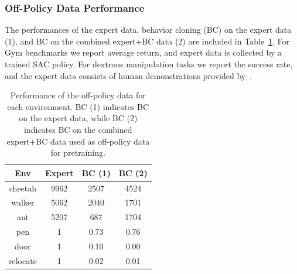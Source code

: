 \documentclass[conference]{IEEEtran}
\begin{document}
\subsubsection{Off-Policy Data Performance}

The performances of the expert data, behavior cloning (BC) on the expert data (1), and BC on the combined expert+BC data (2) are included in Table~\ref{fig:bc}. For Gym benchmarks we report average return, and expert data is collected by a trained SAC policy. For dextrous manipulation tasks we report the success rate, and the expert data consists of human demonstrations provided by~\citet{rajeswaran2018dextrous}.

\begin{table}[h!]
\footnotesize
\begin{tabular}{c|c|c|c}
Env         & Expert & BC (1) & BC (2) \\ \hline
cheetah & 9962   & 2507         & 4524      \\
walker      & 5062   & 2040         & 1701      \\
ant         & 5207   & 687          & 1704      \\
pen         & 1      & 0.73          & 0.76       \\
door        & 1      & 0.10          & 0.00       \\
relocate    & 1      & 0.02          & 0.01       \\
\end{tabular}
\caption{Performance of the off-policy data for each environment. BC (1) indicates BC on the expert data, while BC (2) indicates BC on the combined expert+BC data used as off-policy data for pretraining. }
\label{fig:bc}
\end{table}
\end{document}
